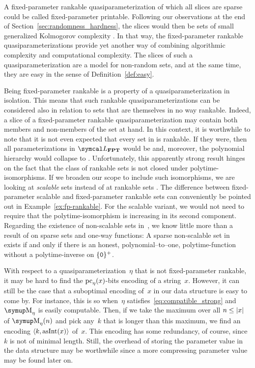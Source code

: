 A fixed-parameter \pdash{}rankable quasiparameterization of which all slices are sparse could be called fixed-parameter \pdash{}printable.
Following our observations at the end of Section~\ref{sec:randomness_hardness}, the slices would then be sets of small generalized Kolmogorov complexity \parencite{allender1988p-printable}.
In that way, the fixed-parameter \pdash{}rankable quasiparameterizations provide yet another way of combining algorithmic complexity and computational complexity.
The slices of such a quasiparameterization are a model for non-random sets, and at the same time, they are easy in the sense of Definition~\ref{def:easy}.

Being fixed-parameter \pdash{}rankable is a property of a quasiparameterization in isolation.
This means that such rankable quasiparameterizations can be considered also in relation to sets that are themselves in no way \pdash{}rankable.
Indeed, a slice of a fixed-parameter \pdash{}rankable quasiparameterization may contain both members and non-members of the set at hand.
In this context, it is worthwhile to note that it is not even expected that every set in  is \pdash{}rankable.
If they were, then all parameterizations in $\calL_\cl{FPT}$ would be  and, moreover, the polynomial hierarchy would collapse to  \parencite{hemachandra1990complexity}.
Unfortunately, this apparently strong result hinges on the fact that the class of rankable sets is not closed under polytime-isomorphisms.
If we broaden our scope to include such isomorphisms, we are looking at \emph{scalable} sets instead of at rankable sets \parencite{goldsmith1996scalability}.
The difference between fixed-parameter scalable and fixed-parameter \pdash{}rankable sets can conveniently be pointed out in Example~\ref{ex:fp-rankable}.
For the scalable variant, we would not need to require that the polytime-isomorphism is increasing in its second component.
Regarding the existence of non-scalable sets in~, we know little more than a result of \textcite{allender1986complexity} on sparse sets and one-way functions:
A sparse non-scalable set in~ exists if and only if there is an honest, polynomial--to--one, polytime-function without a polytime-inverse on $\{\textnormal{\texttt{0}}\}^+$.

With respect to a quasiparameterization~$\eta$ that is not fixed-parameter \pdash{}rankable, it may be hard to find the $\operatorname{pc}_\eta(x)$-bits encoding of a string~$x$.
However, it can still be the case that a suboptimal encoding of~$x$ in our data structure is easy to come by.
For instance, this is so when~$\eta$ satisfies~\eqref{eq:compatible_strong} and $\upM_\eta$ is easily computable.
Then, if we take the maximum over all $n \le {\lvert x\rvert}$ of $\upM_\eta(n)$ and pick any~$k$ that is longer than this maximum, we find an encoding ${\langle k, \operatorname{asInt}(x)\rangle}$ of~$x$.
This encoding has some redundancy, of course, since~$k$ is not of minimal length.
Still, the overhead of storing the parameter value in the data structure may be worthwhile since a more compressing parameter value may be found later on.

